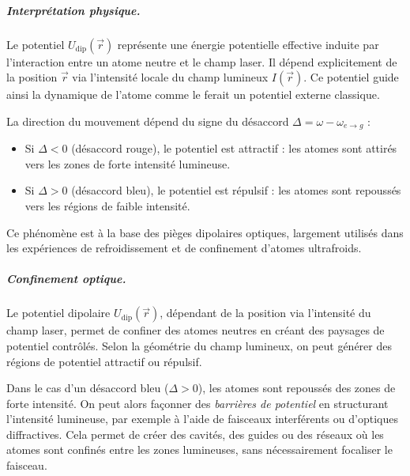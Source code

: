 \subparagraph{Interprétation physique.}

Le potentiel \( U_{\mathrm{dip}}(\vec{r}) \) représente une énergie potentielle effective induite par l’interaction entre un atome neutre et le champ laser. Il dépend explicitement de la position \( \vec{r} \) via l’intensité locale du champ lumineux \( I(\vec{r}) \). Ce potentiel guide ainsi la dynamique de l’atome comme le ferait un potentiel externe classique.

La direction du mouvement dépend du signe du désaccord \( \Delta = \omega - \omega_{e \rightarrow g} \) :

\begin{itemize}[label =$\bullet$]
  \item Si \( \Delta < 0 \) (désaccord rouge), le potentiel est attractif : les atomes sont attirés vers les zones de forte intensité lumineuse.
  \item Si \( \Delta > 0 \) (désaccord bleu), le potentiel est répulsif : les atomes sont repoussés vers les régions de faible intensité.
\end{itemize}

Ce phénomène est à la base des pièges dipolaires optiques, largement utilisés dans les expériences de refroidissement et de confinement d’atomes ultrafroids.




\subparagraph{Confinement optique.}

Le potentiel dipolaire \( U_{\mathrm{dip}}(\vec{r}) \), dépendant de la position via l’intensité du champ laser, permet de confiner des atomes neutres en créant des paysages de potentiel contrôlés. Selon la géométrie du champ lumineux, on peut générer des régions de potentiel attractif ou répulsif.

Dans le cas d’un désaccord bleu (\( \Delta > 0 \)), les atomes sont repoussés des zones de forte intensité. On peut alors façonner des \textit{barrières de potentiel} en structurant l’intensité lumineuse, par exemple à l’aide de faisceaux interférents ou d’optiques diffractives. Cela permet de créer des cavités, des guides ou des réseaux où les atomes sont confinés entre les zones lumineuses, sans nécessairement focaliser le faisceau.



